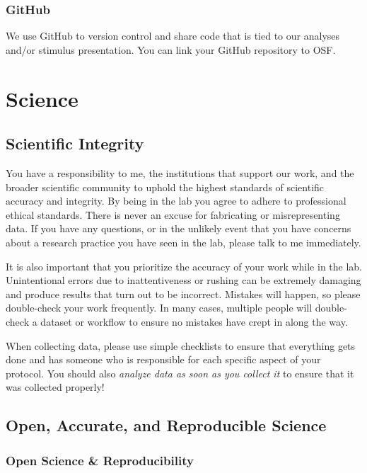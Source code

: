 \documentclass[letterpaper,11pt,oneside]{memoir}
\begin{document}
\subsection{GitHub}
We use GitHub to version control and share code that is tied to our analyses and/or stimulus presentation. You can link your GitHub repository to OSF. 


\chapter{Science}

\section{Scientific Integrity}

You have a responsibility to me, the institutions that support our work, and the broader scientific community to uphold the highest standards of scientific accuracy and integrity. By being in the lab you agree to adhere to professional ethical standards. There is never an excuse for fabricating or misrepresenting data. If you have any questions, or in the unlikely event that you have concerns about a research practice you have seen in the lab, please talk to me immediately.

It is also important that you prioritize the accuracy of your work while in the lab. Unintentional errors due to inattentiveness or rushing can be extremely damaging and produce results that turn out to be incorrect. Mistakes will happen, so please double-check your work frequently. In many cases, multiple people will double-check a dataset or workflow to ensure no mistakes have crept in along the way.

When collecting data, please use simple checklists to ensure that everything gets done and has someone who is responsible for each specific aspect of your protocol. You should also \textit{analyze data as soon as you collect it} to ensure that it was collected properly!


\section{Open, Accurate, and Reproducible Science}
\label{sec:openscience}

\subsection{Open Science \& Reproducibility}
\end{document}
